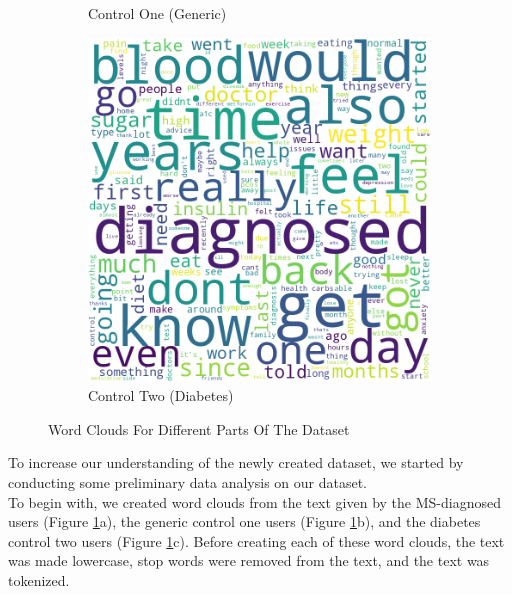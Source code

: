 \documentclass[11pt,a4paper]{article}
\begin{document}
\begin{figure}[h!]
\begin{subfigure}[b]{0.3\linewidth}
    \caption{Control One (Generic)}
  \end{subfigure}
  \hspace{1em}
  \begin{subfigure}[b]{0.3\linewidth}
    \includegraphics[width=\linewidth]{controltwofinal.png}
    \caption{Control Two (Diabetes)}
  \end{subfigure}
  \caption{Word Clouds For Different Parts Of The Dataset}
  \label{fig:wordclouds}
\end{figure}
To increase our understanding of the newly created dataset, we started by conducting some preliminary data analysis on our dataset. \\
\indent To begin with, we created word clouds from the text given by the MS-diagnosed users (Figure \ref{fig:wordclouds}a), the generic control one users (Figure \ref{fig:wordclouds}b), and the diabetes control two users (Figure \ref{fig:wordclouds}c).  Before creating each of these word clouds, the text was made lowercase, stop words were removed from the text, and the text was tokenized. \\
\end{document}
